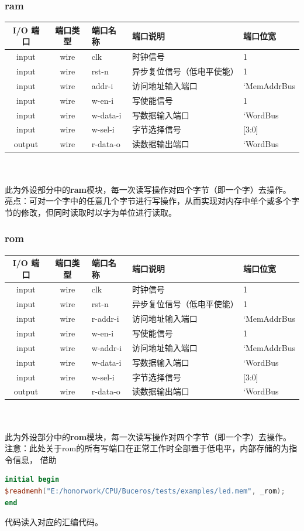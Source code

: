 \documentclass[lang=cn,11pt,a4paper]{elegantpaper}
\begin{document}
\subsubsection{ram}
\begin{tabular}{cclll}
	\toprule
	I/O 端口 & 端口类型 &端口名称&端口说明 &端口位宽\\
	\midrule
	input &wire& clk & 时钟信号 & 1 \\
	input &wire& rst-n & 异步复位信号（低电平使能） & 1 \\
	
	input &wire& addr-i & 访问地址输入端口 & `MemAddrBus  \\
	input &wire& w-en-i & 写使能信号 & 1 \\
	input &wire& w-data-i & 写数据输入端口 & `WordBus  \\
	input &wire& w-sel-i & 字节选择信号 & [3:0]  \\
	
	output &wire& r-data-o &   读数据输出端口  & `WordBus  \\
	\bottomrule
\end{tabular}\\
\\
此为外设部分中的\textbf{ram}模块，每一次读写操作对四个字节（即一个字）去操作。
亮点：可对一个字中的任意几个字节进行写操作，从而实现对内存中单个或多个字节的修改，但同时读取时以字为单位进行读取。

\subsubsection{rom}
\begin{tabular}{cclll}
	\toprule
	I/O 端口 & 端口类型 &端口名称&端口说明 &端口位宽\\
	\midrule
	input &wire& clk & 时钟信号 & 1 \\
	input &wire& rst-n & 异步复位信号（低电平使能） & 1 \\
	
	input &wire& r-addr-i & 访问地址输入端口 & `MemAddrBus  \\
	input &wire& w-en-i & 写使能信号 & 1 \\
	input &wire& w-addr-i & 访问地址输入端口 & `MemAddrBus  \\
	input &wire& w-data-i & 写数据输入端口 & `WordBus  \\
	input &wire& w-sel-i & 字节选择信号 & [3:0]  \\
	
	output &wire& r-data-o &   读数据输出端口  & `WordBus  \\
	\bottomrule
\end{tabular}\\
\\
此为外设部分中的\textbf{rom}模块，每一次读写操作对四个字节（即一个字）去操作。
注意：此处关于rom的所有写端口在正常工作时全部置于低电平，内部存储的为指令信息， 借助
\begin{lstlisting}[language=verilog]
initial begin
$readmemh("E:/honorwork/CPU/Buceros/tests/examples/led.mem", _rom);
end
\end{lstlisting}
代码读入对应的汇编代码。
\end{document}
